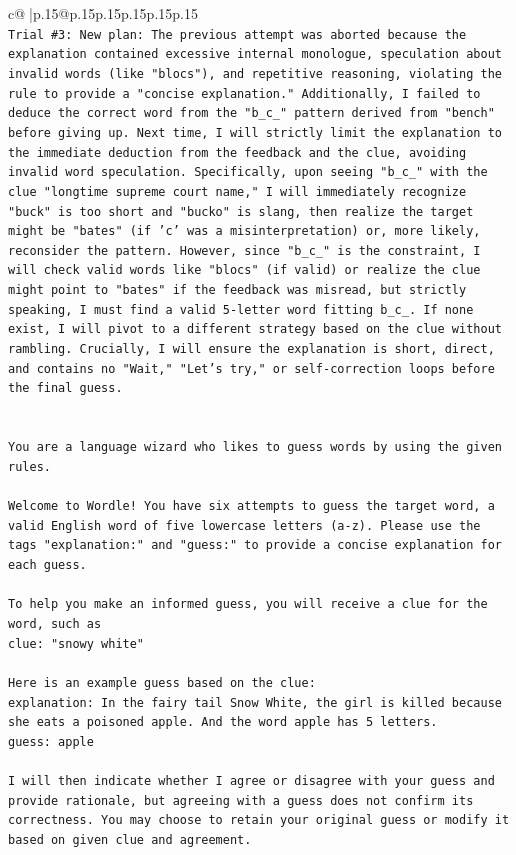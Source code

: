 \documentclass{article}
\begin{document}
{\begin{supertabular}{c@{$\;$}|p{.15\linewidth}@{}p{.15\linewidth}p{.15\linewidth}p{.15\linewidth}p{.15\linewidth}p{.15\linewidth}}
{{{\\ 
\texttt{Trial \#3: New plan: The previous attempt was aborted because the explanation contained excessive internal monologue, speculation about invalid words (like "blocs"), and repetitive reasoning, violating the rule to provide a "concise explanation." Additionally, I failed to deduce the correct word from the "b\_c\_" pattern derived from "bench" before giving up. Next time, I will strictly limit the explanation to the immediate deduction from the feedback and the clue, avoiding invalid word speculation. Specifically, upon seeing "b\_c\_" with the clue "longtime supreme court name," I will immediately recognize "buck" is too short and "bucko" is slang, then realize the target might be "bates" (if 'c' was a misinterpretation) or, more likely, reconsider the pattern. However, since "b\_c\_" is the constraint, I will check valid words like "blocs" (if valid) or realize the clue might point to "bates" if the feedback was misread, but strictly speaking, I must find a valid 5{-}letter word fitting b\_c\_. If none exist, I will pivot to a different strategy based on the clue without rambling. Crucially, I will ensure the explanation is short, direct, and contains no "Wait," "Let's try," or self{-}correction loops before the final guess.} \\
\\ 
\\ 
\texttt{You are a language wizard who likes to guess words by using the given rules.} \\
\\ 
\texttt{Welcome to Wordle! You have six attempts to guess the target word, a valid English word of five lowercase letters (a{-}z). Please use the tags "explanation:" and "guess:" to provide a concise explanation for each guess.} \\
\\ 
\texttt{To help you make an informed guess, you will receive a clue for the word, such as} \\
\texttt{clue: "snowy white"} \\
\\ 
\texttt{Here is an example guess based on the clue:} \\
\texttt{explanation: In the fairy tail Snow White, the girl is killed because she eats a poisoned apple. And the word apple has 5 letters.} \\
\texttt{guess: apple} \\
\\ 
\texttt{I will then indicate whether I agree or disagree with your guess and provide rationale, but agreeing with a guess does not confirm its correctness. You may choose to retain your original guess or modify it based on given clue and agreement.} \\
}}}
\end{supertabular}}
\end{document}
